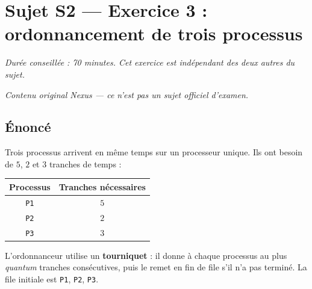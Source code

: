 \section*{Sujet S2 --- Exercice 3 : ordonnancement de trois processus}

\textit{Durée conseillée : 70 minutes. Cet exercice est indépendant des deux
autres du sujet.}

\medskip
\textit{Contenu original Nexus --- ce n'est pas un sujet officiel d'examen.}

\subsection*{Énoncé}

Trois processus arrivent en même temps sur un processeur unique. Ils ont besoin
de $5$, $2$ et $3$ tranches de temps :

\begin{center}
\begin{tabular}{|c|c|}
\hline
\textbf{Processus} & \textbf{Tranches nécessaires} \\
\hline
\texttt{P1} & $5$ \\
\hline
\texttt{P2} & $2$ \\
\hline
\texttt{P3} & $3$ \\
\hline
\end{tabular}
\end{center}

L'ordonnanceur utilise un \textbf{tourniquet} : il donne à chaque processus au
plus \emph{quantum} tranches consécutives, puis le remet en fin de file s'il
n'a pas terminé. La file initiale est \texttt{P1}, \texttt{P2}, \texttt{P3}.

